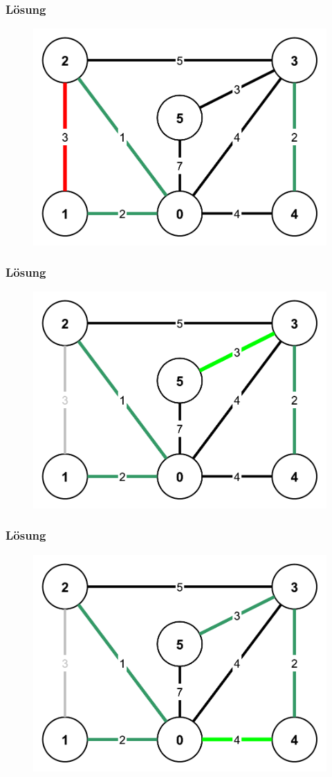 \begin{frame}
\frametitle{Lösung}
\begin{figure}
\includegraphics[width=0.75\linewidth]{kruskal_graphs/step4.pdf}
\end{figure}
\end{frame}

\begin{frame}
\frametitle{Lösung}
\begin{figure}
\includegraphics[width=0.75\linewidth]{kruskal_graphs/step5.pdf}
\end{figure}
\end{frame}

\begin{frame}
\frametitle{Lösung}
\begin{figure}
\includegraphics[width=0.75\linewidth]{kruskal_graphs/step6.pdf}
\end{figure}
\end{frame}

